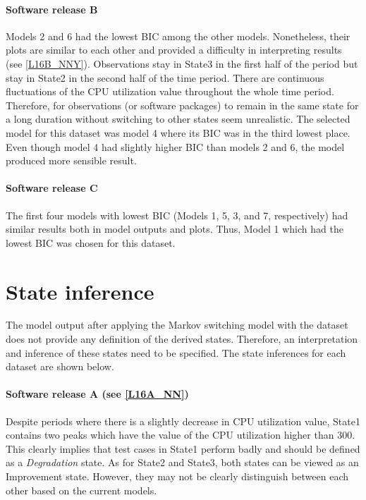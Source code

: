 \paragraph*{Software release B}

Models 2 and 6 had the lowest BIC among the other models. Nonetheless,
their plots are similar to each other and provided a difficulty in
interpreting results (see \ref{L16B_NNY}). Observations stay in State3
in the first half of the period but stay in State2 in the second half
of the time period. There are continuous fluctuations of the CPU utilization
value throughout the whole time period. Therefore, for observations
(or software packages) to remain in the same state for a long duration
without switching to other states seem unrealistic. The selected model
for this dataset was model 4 where its BIC was in the third lowest
place. Even though model 4 had slightly higher BIC than models 2 and
6, the model produced more sensible result.

\paragraph*{Software release C}

The first four models with lowest BIC (Models 1, 5, 3, and 7, respectively)
had similar results both in model outputs and plots. Thus, Model 1
which had the lowest BIC was chosen for this dataset.

\section{State inference}

The model output after applying the Markov switching model with the
dataset does not provide any definition of the derived states. Therefore,
an interpretation and inference of these states need to be specified.
The state inferences for each dataset are shown below. 

\paragraph{Software release A (see \ref{L16A_NN})}

Despite periods where there is a slightly decrease in CPU utilization
value, State1 contains two peaks which have the value of the CPU utilization
higher than 300. This clearly implies that test cases in State1 perform
badly and should be defined as a \emph{Degradation} state. As for
State2 and State3, both states can be viewed as an Improvement state.
However, they may not be clearly distinguish between each other based
on the current models. 

